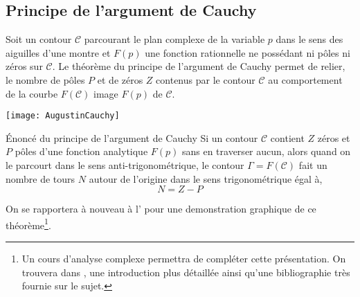 \subsection{Principe de l'argument de Cauchy}
Soit un contour $\mathcal{C}$ parcourant le plan complexe de 
la variable $p$ dans le sens des aiguilles d'une montre et $F(p)$ une fonction 
rationnelle ne possédant ni pôles ni zéros sur $\mathcal{C}$. Le théorème du 
principe de l'argument de Cauchy permet de relier, le nombre de pôles $P$ et 
de zéros $Z$ contenus par le contour $\mathcal{C}$ au comportement de la 
courbe $F(\mathcal{C})$ image $F(p)$ de $\mathcal{C}$.
\begin{marginfigure}
    \centering
    \texttt{[image: AugustinCauchy]} 
    \caption*{\textbf{Augustin Louis Cauchy} 
              (1789-1857), mathématicien français (X1807)}
\end{marginfigure}
\begin{theorem}{\'Enoncé du principe de l'argument de Cauchy
    } 
    Si un contour $\mathcal{C}$ contient $Z$ zéros et $P$ pôles d'une fonction 
    analytique $F(p)$ sans en traverser aucun, alors quand on le parcourt dans 
    le sens anti-trigonométrique, le contour $\Gamma=F(\mathcal{C})$ fait un 
    nombre de tours $N$ autour de l'origine dans le sens trigonométrique égal 
    à,
    \[ 
        N=Z-P
    \]
\end{theorem}
On se rapportera à nouveau à l' pour une demonstration 
graphique de ce théorème\footnote{Un cours d'analyse complexe permettra de 
compléter cette présentation. On trouvera dans \cite{laas_pc7bis,reg}, 
une introduction plus détaillée ainsi qu'une bibliographie très fournie 
sur le sujet.}.

